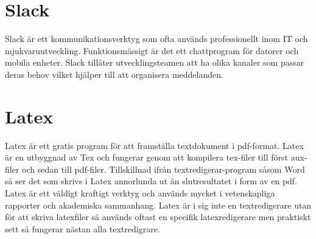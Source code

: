 \section{Slack}
Slack är ett kommunikationsverktyg som ofta används professionellt inom IT och mjukvaruutveckling.\cite{Slack} Funktionsmässigt är det ett chattprogram för datorer och mobila enheter. Slack tillåter utvecklingsteamen att ha olika kanaler som passar deras behov vilket hjälper till att organisera meddelanden.

\section{Latex}
Latex är ett gratis program för att framställa textdokument i pdf-format. Latex är en utbyggnad av Tex och fungerar genom att kompilera tex-filer till först aux-filer och sedan till pdf-filer. Tillskillnad ifrån textredigerar-program såsom Word så ser det som skrivs i Latex annorlunda ut än slutresultatet i form av en pdf. Latex är ett väldigt kraftigt verktyg och används mycket i vetenskapliga rapporter och akademiska sammanhang.\cite{ctan} Latex är i sig inte en textredigerare utan för att skriva latexfiler så används oftast en specifik latexredigerare men praktiskt sett så fungerar nästan alla textredigrare.
